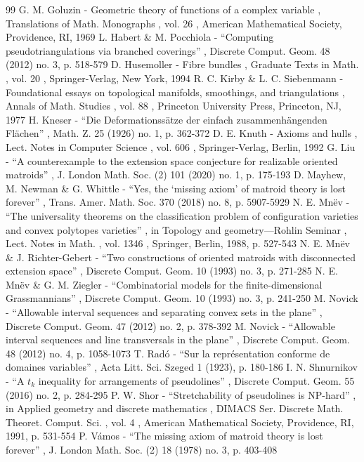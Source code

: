 \documentclass[11pt]{article}
\numberwithin{equation}{section}
\theoremstyle{remark}
\begin{document}
\begin{thebibliography}{99}
 G. M. Goluzin - Geometric theory of functions of a complex variable , Translations of Math. Monographs , vol. 26 , American Mathematical Society, Providence, RI, 1969
 L. Habert \& M. Pocchiola - “Computing pseudotriangulations via branched coverings” , Discrete Comput. Geom. 48 (2012) no. 3, p. 518-579
 D. Husemoller - Fibre bundles , Graduate Texts in Math. , vol. 20 , Springer-Verlag, New York, 1994
 R. C. Kirby \& L. C. Siebenmann - Foundational essays on topological manifolds, smoothings, and triangulations , Annals of Math. Studies , vol. 88 , Princeton University Press, Princeton, NJ, 1977
 H. Kneser - “Die Deformationssätze der einfach zusammenhängenden Flächen” , Math. Z. 25 (1926) no. 1, p. 362-372
 D. E. Knuth - Axioms and hulls , Lect. Notes in Computer Science , vol. 606 , Springer-Verlag, Berlin, 1992
 G. Liu - “A counterexample to the extension space conjecture for realizable oriented matroids” , J. London Math. Soc. (2) 101 (2020) no. 1, p. 175-193
 D. Mayhew, M. Newman \& G. Whittle - “Yes, the ‘missing axiom’ of matroid theory is lost forever” , Trans. Amer. Math. Soc. 370 (2018) no. 8, p. 5907-5929
 N. E. Mnëv - “The universality theorems on the classification problem of configuration varieties and convex polytopes varieties” , in Topology and geometry—Rohlin Seminar , Lect. Notes in Math. , vol. 1346 , Springer, Berlin, 1988, p. 527-543
 N. E. Mnëv \& J. Richter-Gebert - “Two constructions of oriented matroids with disconnected extension space” , Discrete Comput. Geom. 10 (1993) no. 3, p. 271-285
 N. E. Mnëv \& G. M. Ziegler - “Combinatorial models for the finite-dimensional Grassmannians” , Discrete Comput. Geom. 10 (1993) no. 3, p. 241-250
 M. Novick - “Allowable interval sequences and separating convex sets in the plane” , Discrete Comput. Geom. 47 (2012) no. 2, p. 378-392
 M. Novick - “Allowable interval sequences and line transversals in the plane” , Discrete Comput. Geom. 48 (2012) no. 4, p. 1058-1073
 T. Radó - “Sur la représentation conforme de domaines variables” , Acta Litt. Sci. Szeged 1 (1923), p. 180-186
 I. N. Shnurnikov - “A $t_k$ inequality for arrangements of pseudolines” , Discrete Comput. Geom. 55 (2016) no. 2, p. 284-295
 P. W. Shor - “Stretchability of pseudolines is NP-hard” , in Applied geometry and discrete mathematics , DIMACS Ser. Discrete Math. Theoret. Comput. Sci. , vol. 4 , American Mathematical Society, Providence, RI, 1991, p. 531-554
 P. Vámos - “The missing axiom of matroid theory is lost forever” , J. London Math. Soc. (2) 18 (1978) no. 3, p. 403-408
\end{thebibliography}
\end{document}
